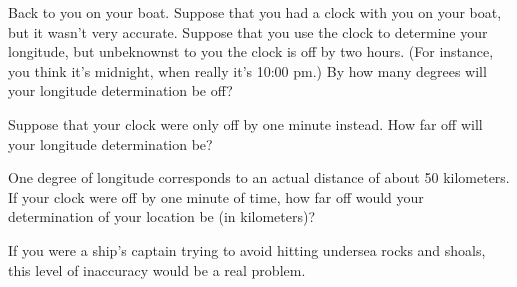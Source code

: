 \answerspace{1in}

Back to you on your boat. Suppose that you had a clock with you
on your boat, but it wasn't very accurate. Suppose that you use the clock
to determine your longitude, but unbeknownst to you the clock is off by
two hours. (For instance, you think it's midnight, when really it's 10:00
pm.) By how many degrees will your longitude determination be off?

\answerspace{1in}

Suppose that your clock were only off by one minute instead. How far
off will your longitude determination be?

\answerspace{1in}

One degree of longitude corresponds to an actual distance of about 50 
kilometers. If your clock were off by one minute of time, 
how far off would your determination of your location be (in kilometers)?

\answerspace{1in}

If you were a ship's captain 
trying to avoid hitting undersea rocks
and shoals, this level of inaccuracy would be a real problem.

